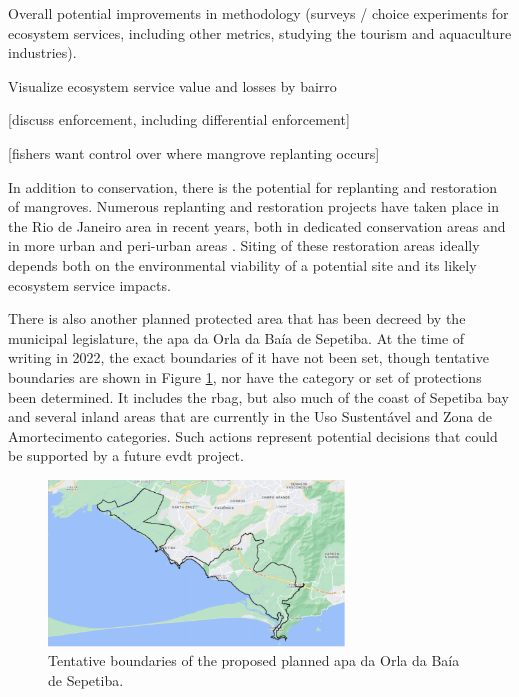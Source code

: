 Overall potential improvements in methodology (surveys / choice experiments for ecosystem services, including other metrics, studying the tourism and aquaculture industries).

Visualize ecosystem service value and losses by bairro 

[discuss enforcement, including differential enforcement]

[fishers want control over where mangrove replanting occurs]

In addition to conservation, there is the potential for replanting and restoration of mangroves. Numerous replanting and restoration projects have taken place in the Rio de Janeiro area in recent years, both in dedicated conservation areas \cite{granadoAssessingGeneticDiversity2018} and in more urban and peri-urban areas \cite{rioprefeituraEnvironmentalRecoveryRodrigo2019, soaresEstruturaVegetalGrau1999}. Siting of these restoration areas ideally depends both on the environmental viability of a potential site and its likely ecosystem service impacts.

There is also another planned protected area that has been decreed by the municipal legislature, the \ac{apa} da Orla da Baía de Sepetiba. At the time of writing in 2022, the exact boundaries of it have not been set, though tentative boundaries are shown in Figure \ref{fig:apa_sepetiba}, nor have the category or set of protections been determined. It includes the \ac{rbag}, but also much of the coast of Sepetiba bay and several inland areas that are currently in the Uso Sustentável and Zona de Amortecimento categories. Such actions represent potential decisions that could be supported by a future \ac{evdt} project.

\begin{figure}[!htb] 
\centering
\includegraphics[width=0.7\textwidth]{Figures/chap4/apa_sepetiba.png}
\caption[APA da Orla da Baía de Sepetiba]{Tentative boundaries of the proposed planned \ac{apa} da Orla da Baía de Sepetiba.}
\label{fig:apa_sepetiba}
\end{figure}


